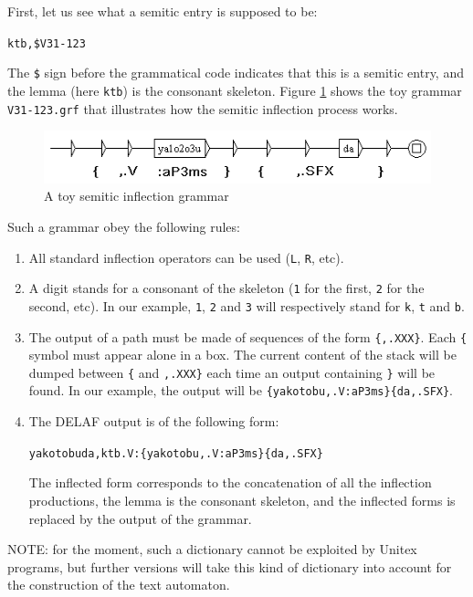 \bigskip
\noindent First, let us see what a semitic entry is supposed to be:

\bigskip
\noindent \verb+ktb,$V31-123+

\bigskip
\noindent The \verb+$+ sign before the grammatical code indicates that
this is a semitic entry, and the lemma (here \verb+ktb+) is the consonant
skeleton. Figure \ref{semitic-grammar} shows the toy grammar \verb+V31-123.grf+
that illustrates how the semitic inflection process works.  

\bigskip
\begin{figure}[!ht]
\begin{center}
\includegraphics[width=11.5cm]{resources/img/fig3-7a.png}
\caption{A toy semitic inflection grammar\label{semitic-grammar}}
\end{center}
\end{figure}

\bigskip
\noindent Such a grammar obey the following rules:
\begin{enumerate}
  \item All standard inflection operators can be used (\verb+L+, \verb+R+, etc).
  \item A digit stands for a consonant of the skeleton (\verb+1+ for the first,
  \verb+2+ for the second, etc). In our example, \verb+1+, \verb+2+ and
  \verb+3+ will respectively stand for \verb+k+, \verb+t+ and
  \verb+b+.
  \item The output of a path must be made of sequences of the form
  \verb+{,.XXX}+. Each \verb+{+ symbol must appear alone in a box. The current
  content of the stack will be dumped between \verb+{+ and \verb+,.XXX}+ each
  time an output containing \verb+}+ will be found. In our example, the output
  will be \verb+{yakotobu,.V:aP3ms}{da,.SFX}+.
  \item The DELAF output is of the following form: 
  
  \verb+yakotobuda,ktb.V:{yakotobu,.V:aP3ms}{da,.SFX}+
  
  The inflected form corresponds to the concatenation of all the inflection
  productions, the lemma is the consonant skeleton, and the inflected forms is
  replaced by the output of the grammar.
\end{enumerate}  

\noindent NOTE: for the moment, such a dictionary
cannot be exploited by Unitex programs, but further versions will take this
kind of dictionary into account for the construction of the text automaton.


